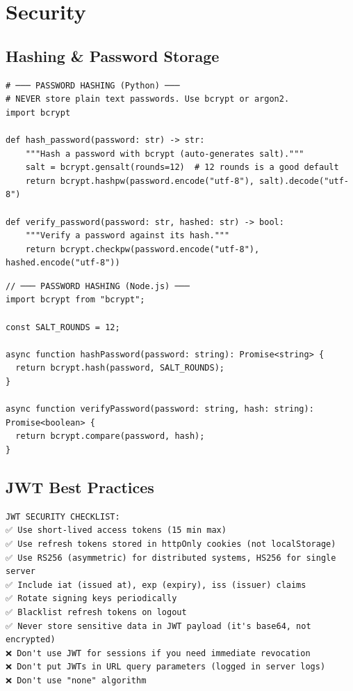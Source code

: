 \documentclass[10pt, a4paper]{article}
\begin{document}
\bigskip


\section{Security}


\subsection{Hashing \& Password Storage}


\begin{lstlisting}[language=mypython]
# ─── PASSWORD HASHING (Python) ───
# NEVER store plain text passwords. Use bcrypt or argon2.
import bcrypt

def hash_password(password: str) -> str:
    """Hash a password with bcrypt (auto-generates salt)."""
    salt = bcrypt.gensalt(rounds=12)  # 12 rounds is a good default
    return bcrypt.hashpw(password.encode("utf-8"), salt).decode("utf-8")

def verify_password(password: str, hashed: str) -> bool:
    """Verify a password against its hash."""
    return bcrypt.checkpw(password.encode("utf-8"), hashed.encode("utf-8"))
\end{lstlisting}


\begin{lstlisting}[language=myjs]
// ─── PASSWORD HASHING (Node.js) ───
import bcrypt from "bcrypt";

const SALT_ROUNDS = 12;

async function hashPassword(password: string): Promise<string> {
  return bcrypt.hash(password, SALT_ROUNDS);
}

async function verifyPassword(password: string, hash: string): Promise<boolean> {
  return bcrypt.compare(password, hash);
}
\end{lstlisting}


\subsection{JWT Best Practices}


\begin{lstlisting}
JWT SECURITY CHECKLIST:
✅ Use short-lived access tokens (15 min max)
✅ Use refresh tokens stored in httpOnly cookies (not localStorage)
✅ Use RS256 (asymmetric) for distributed systems, HS256 for single server
✅ Include iat (issued at), exp (expiry), iss (issuer) claims
✅ Rotate signing keys periodically
✅ Blacklist refresh tokens on logout
✅ Never store sensitive data in JWT payload (it's base64, not encrypted)
❌ Don't use JWT for sessions if you need immediate revocation
❌ Don't put JWTs in URL query parameters (logged in server logs)
❌ Don't use "none" algorithm
\end{lstlisting}
\end{document}

